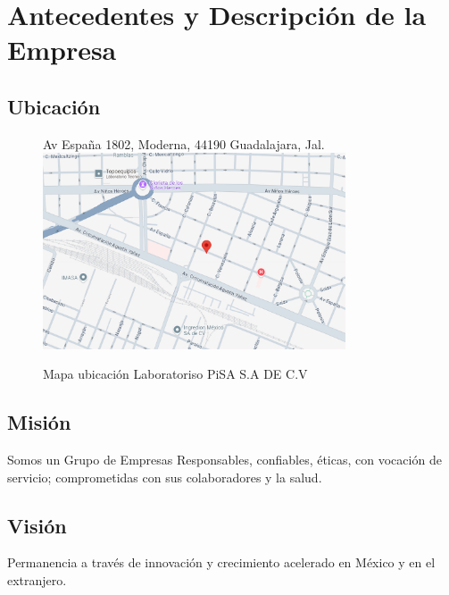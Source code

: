 \documentclass[12pt,letterpaper,spanish, xcolor=table]{report}
\numberwithin{figure}{subsection}
\begin{document}
\chapter{Antecedentes y Descripción de la Empresa}
\newpage



\section{Ubicación}
	
\begin{figure}[htp]
	\centering
	Av España 1802, Moderna, 44190 Guadalajara, Jal.
	\includegraphics[width=0.8\textwidth]{Imagenes/ubicacion.png}
	\caption{Mapa ubicación Laboratoriso PiSA S.A DE C.V}\label{a1}
\end{figure}




\section{Misión}
Somos un Grupo de Empresas Responsables, confiables, éticas, con vocación de servicio; comprometidas con sus colaboradores y la salud.

\section{Visión}
Permanencia a través de innovación y crecimiento acelerado en México y en el extranjero.
	
\end{document}
